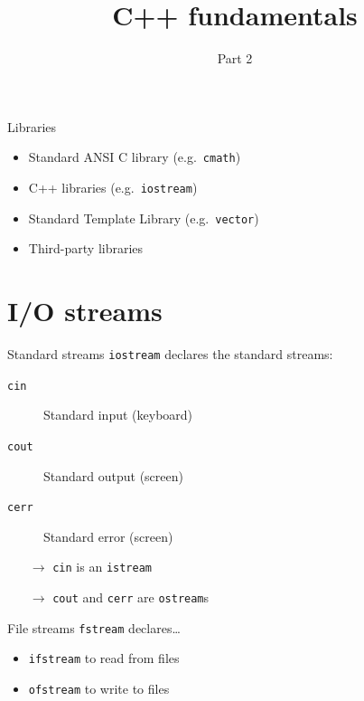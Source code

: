 

\title{C++ fundamentals}
\subtitle{Part 2}



\maketitle

\begin{frame}[fragile]{Libraries}
    \begin{itemize}
        \item Standard ANSI C library (e.g.\ \texttt{cmath})
        \item C++ libraries (e.g.\ \texttt{iostream})
        \item Standard Template Library (e.g.\ \texttt{vector})
        \item Third-party libraries
    \end{itemize}
\end{frame}

\section{I/O streams}

\begin{frame}[fragile]{Standard streams}
    \texttt{iostream} declares the standard streams:
    \begin{description}
        \item[\texttt{cin}]  Standard input (keyboard)
        \item[\texttt{cout}] Standard output (screen)
        \item[\texttt{cerr}] Standard error (screen)
    \end{description}
    \begin{itemize}
        \item[$\rightarrow$] \texttt{cin} is an
                             \texttt{istream}
        \item[$\rightarrow$] \texttt{cout} and \texttt{cerr}
                             are \texttt{ostream}s
    \end{itemize}
\end{frame}

\begin{frame}[fragile]{File streams}
    \texttt{fstream} declares\ldots
    \begin{itemize}
        \item \texttt{ifstream} to read from files
        \item \texttt{ofstream} to write to files
    \end{itemize}
\end{frame}

